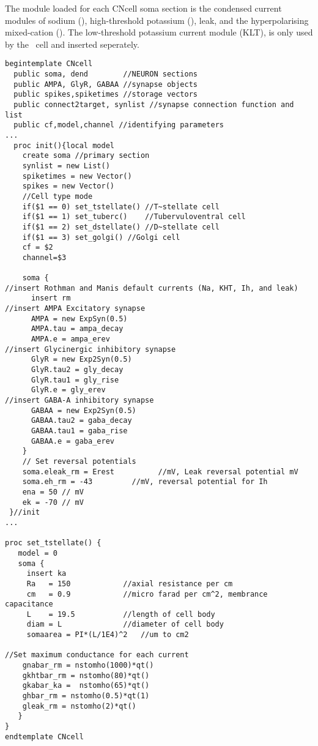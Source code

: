 The  module loaded for each \textsf{CNcell} soma section is the condensed current modules of sodium (), high-threshold potassium (), leak, and the hyperpolarising mixed-cation ().
The low-threshold potassium current module (KLT), is only used by the \DS~cell and inserted seperately.

\begin{lstlisting}[label=lst:CellTemplate,caption=Rothman and Manis cochlear nucleus cell template (in CNcell.tem)]
  begintemplate CNcell
  public soma, dend        //NEURON sections
  public AMPA, GlyR, GABAA //synapse objects
  public spikes,spiketimes //storage vectors
  public connect2target, synlist //synapse connection function and list
  public cf,model,channel //identifying parameters
...
  proc init(){local model
    create soma //primary section
    synlist = new List()
    spiketimes = new Vector()
    spikes = new Vector()
    //Cell type mode
    if($1 == 0) set_tstellate() //T~stellate cell
    if($1 == 1) set_tuberc()    //Tubervuloventral cell
    if($1 == 2) set_dstellate() //D~stellate cell
    if($1 == 3) set_golgi() //Golgi cell
    cf = $2
    channel=$3

    soma {
//insert Rothman and Manis default currents (Na, KHT, Ih, and leak)
      insert rm
//insert AMPA Excitatory synapse
      AMPA = new ExpSyn(0.5)
      AMPA.tau = ampa_decay
      AMPA.e = ampa_erev
//insert Glycinergic inhibitory synapse
      GlyR = new Exp2Syn(0.5)
      GlyR.tau2 = gly_decay
      GlyR.tau1 = gly_rise
      GlyR.e = gly_erev
//insert GABA-A inhibitory synapse
      GABAA = new Exp2Syn(0.5)
      GABAA.tau2 = gaba_decay
      GABAA.tau1 = gaba_rise
      GABAA.e = gaba_erev
    }
    // Set reversal potentials
    soma.eleak_rm = Erest          //mV, Leak reversal potential mV
    soma.eh_rm = -43         //mV, reversal potential for Ih
    ena = 50 // mV
    ek = -70 // mV
 }//init
...

proc set_tstellate() {
   model = 0
   soma {
     insert ka
     Ra   = 150            //axial resistance per cm
     cm   = 0.9            //micro farad per cm^2, membrance capacitance
     L    = 19.5           //length of cell body
     diam = L              //diameter of cell body
     somaarea = PI*(L/1E4)^2   //um to cm2

//Set maximum conductance for each current
	gnabar_rm = nstomho(1000)*qt()
	gkhtbar_rm = nstomho(80)*qt()
	gkabar_ka =  nstomho(65)*qt()
	ghbar_rm = nstomho(0.5)*qt(1)
	gleak_rm = nstomho(2)*qt()
   }
}
endtemplate CNcell


\end{lstlisting}



